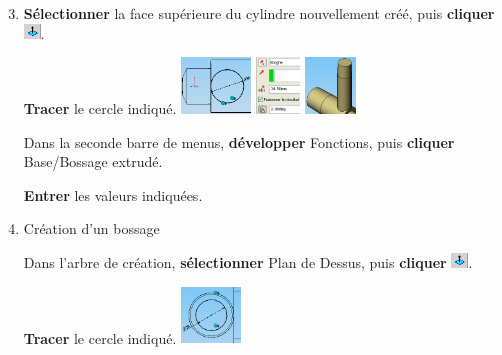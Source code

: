 \begin{enumerate}
\setcounter{enumi}{2}
 \item  \textbf{Sélectionner} la face supérieure du cylindre nouvellement créé, puis \textbf{cliquer} \includegraphics[height=0.4cm]{img/SW-023.png}.

\textbf{Tracer} le cercle indiqué.
\includegraphics[height=1.5cm]{img/SW-024.png} 
\includegraphics[height=1.5cm]{img/SW-025.png}
\includegraphics[height=1.5cm]{img/SW-026.png}

Dans la seconde barre de menus, \textbf{développer} Fonctions, puis  \textbf{cliquer} Base/Bossage extrudé. 

 \textbf{Entrer} les valeurs indiquées. 

 \item Création d'un bossage

Dans l'arbre de création, \textbf{sélectionner} Plan de Dessus, puis \textbf{cliquer} \includegraphics[height=0.4cm]{img/SW-027.png}.

\textbf{Tracer} le cercle indiqué. 
 \includegraphics[height=1.5cm]{img/SW-028.png} 
\end{enumerate}


